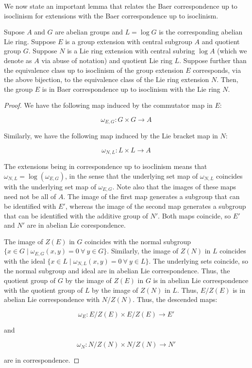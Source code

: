 We now state an important lemma that relates the Baer correspondence
up to isoclinism for extensions with the Baer correspondence up to
isoclinism.

\begin{lemma}\label{lemma:bcuti-extensions-implies-bcuti}
  Supose $A$ and $G$ are abelian groups and $L = \log G$ is the
  corresponding abelian Lie ring. Suppose $E$ is a group extension
  with central subgroup $A$ and quotient group $G$. Suppose $N$ is a
  Lie ring extension with central subring $\log A$ (which we denote as
  $A$ via abuse of notation) and quotient Lie ring $L$. Suppose
  further than the equivalence class up to isoclinism of the group
  extension $E$ corresponds, via the above bijection, to the
  equivalence class of the Lie ring extension $N$. Then, the group $E$
  is in Baer correspondence up to isoclinism with the Lie ring $N$.
\end{lemma}

\begin{proof}
  We have the following map induced by the commutator map in $E$:

  $$\omega_{E,G}: G \times G \to A$$

  Similarly, we have the following map induced by the Lie bracket map
  in $N$:

  $$\omega_{N,L}: L \times L \to A$$

  The extensions being in correspondence up to isoclinism means that
  $\omega_{N,L} = \log(\omega_{E,G})$, in the sense that the underlying set
  map of $\omega_{N,L}$ coincides with the underlying set map of
  $\omega_{E,G}$. Note also that the images of these maps need not be all
  of $A$. The image of the first map generates a subgroup that can be
  identified with $E'$, whereas the image of the second map generates
  a subgroup that can be identified with the additive group of
  $N'$. Both maps coincide, so $E'$ and $N'$ are in abelian Lie
  corespondence.

  The image of $Z(E)$ in $G$ coincides with the normal subgroup $\{ x
  \in G \mid \omega_{E,G}(x,y) = 0 \ \forall \ y \in G\}$. Similarly,
  the image of $Z(N)$ in $L$ coincides with the ideal $\{ x \in L \mid
  \omega_{N,L}(x,y) = 0 \ \forall \ y \in L \}$. The underlying sets
  coincide, so the normal subgroup and ideal are in abelian Lie
  correspondence. Thus, the quotient group of $G$ by the image of
  $Z(E)$ in $G$ is in abelian Lie correspondence with the quotient
  group of $L$ by the image of $Z(N)$ in $L$. Thus, $E/Z(E)$ is in
  abelian Lie correspondence with $N/Z(N)$. Thus, the descended maps:

  $$\omega_E: E/Z(E) \times E/Z(E) \to E'$$

  and

  $$\omega_N: N/Z(N) \times N/Z(N) \to N'$$

  are in correspondence.
\end{proof}

